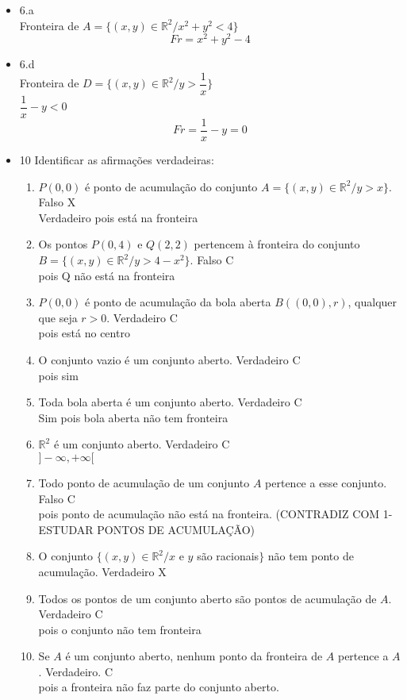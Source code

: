 \documentclass{article}
\begin{document}
\begin{itemize}
		\item 6.a
		\\Fronteira de $A =\{(x,y)\in \mathbb{R}^2/x^2+y^2<4\}$
		$$Fr = x^2+y^2 - 4$$
		\item 6.d
		\\Fronteira de $D=\{(x,y)\in \mathbb{R}^2/y>\dfrac{1}{x}\}$
		\\$\dfrac{1}{x}-y<0$
		$$Fr = \dfrac{1}{x}-y = 0$$
		\item 10 Identificar as afirmações verdadeiras:
			\begin{enumerate}
				\item $P(0,0)$ é ponto de acumulação do conjunto $A =\{(x,y) \in \mathbb{R}^2 / y>x\}$. Falso X \\Verdadeiro pois está na fronteira
				\item Os pontos $P(0,4)$ e $Q(2,2)$ pertencem à fronteira do conjunto $B = \{(x,y) \in \mathbb{R}^2 / y>4-x^2\}$. Falso C \\pois Q não está na fronteira
				\item $P(0,0)$ é ponto de acumulação da bola aberta $B((0,0),r)$, qualquer que seja $r>0$.  Verdadeiro C \\pois está no centro
				\item O conjunto vazio é um conjunto aberto. Verdadeiro C\\pois sim
				\item Toda bola aberta é um conjunto aberto. Verdadeiro C\\Sim pois bola aberta não tem fronteira
				\item $\mathbb{R}^2$ é um conjunto aberto. Verdadeiro C\\$]-\infty,+\infty[$
				\item Todo ponto de acumulação de um conjunto $A$ pertence a esse conjunto. Falso C \\pois ponto de acumulação não está na fronteira. (CONTRADIZ COM 1- ESTUDAR PONTOS DE ACUMULAÇÃO)
				\item O conjunto $\{(x,y) \in \mathbb{R}^2 / x$ e $y$ são racionais$\}$ não tem ponto de acumulação. Verdadeiro X
				\item Todos os pontos de um conjunto aberto são pontos de acumulação de $A$. Verdadeiro C\\pois o conjunto não tem fronteira
				\item Se $A$ é um conjunto aberto, nenhum ponto da fronteira de $A$ pertence a $A$. Verdadeiro. C\\pois a fronteira não faz parte do conjunto aberto.
			\end{enumerate}
	\end{itemize}
\end{document}
